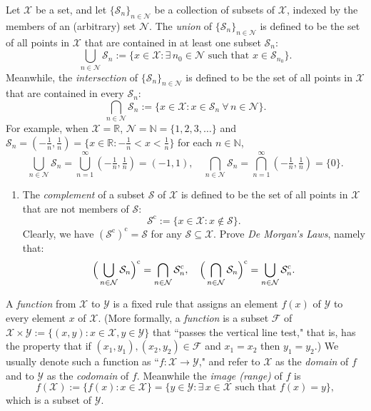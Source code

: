 \documentclass[12 pt,letterpaper]{article}
\newcommand{\bbN}{\mathbb{N}}
\newcommand{\bbR}{\mathbb{R}}
\newcommand{\calF}{\mathcal{F}}
\newcommand{\calN}{\mathcal{N}}
\newcommand{\calS}{\mathcal{S}}
\newcommand{\calX}{\mathcal{X}}
\newcommand{\calY}{\mathcal{Y}}
\newcommand{\rmc}{\mathrm{c}}
\newcommand{\Bigparen}[1]{\Bigl({#1}\Bigr)}
\newcommand{\set}[1]{\{{#1}\}}
\begin{document}
\noindent
Let $\calX$ be a set,
and let $\set{\calS_n}_{n\in\calN}$ be a collection of subsets of $\calX$, indexed by the members of an (arbitrary) set $\calN$.
The \textit{union} of $\set{\calS_n}_{n\in\calN}$ is defined to be the set of all points in $\calX$ that are contained in at least one subset $\calS_n$:
\begin{equation*}
\bigcup_{n\in\calN}\calS_n
:=\set{x\in\calX: \exists\, n_0\in\calN\text{ such that }x\in\calS_{n_0}}.
\end{equation*}
Meanwhile, the \textit{intersection} of $\set{\calS_n}_{n\in\calN}$ is defined to be the set of all points in $\calX$ that are contained in every $\calS_n$:
\begin{equation*}
\bigcap_{n\in\calN}\calS_n
:=\set{x\in\calX: x\in\calS_n\ \forall\,n\in\calN}.
\end{equation*}
For example, when $\calX=\bbR$, $\calN=\bbN=\set{1,2,3,\dotsc}$ and $\calS_n=(-\frac1n,\frac1n)=\set{x\in\bbR: -\frac1n<x<\frac1n}$ for each $n\in\bbN$,
\begin{equation*}
\bigcup_{n\in\calN}\calS_n
=\bigcup_{n=1}^\infty(-\tfrac1n,\tfrac1n)=(-1,1),
\quad
\bigcap_{n\in\calN}\calS_n
=\bigcap_{n=1}^\infty(-\tfrac1n,\tfrac1n)=\set{0}.
\end{equation*}

\begin{enumerate}
\item
The \textit{complement} of a subset $\calS$ of $\calX$ is defined to be the set of all points in $\calX$ that are not members of $\calS$:
\begin{equation*}
\calS^\rmc:=\set{x\in\calX: x\notin\calS}.
\end{equation*}
Clearly, we have $(\calS^\rmc)^\rmc=\calS$ for any $\calS\subseteq\calX$.
Prove \textit{De Morgan's Laws}, namely that:
\begin{equation*}
\Bigparen{\,\bigcup_{n\in\calN}\calS_n}^\rmc
=\bigcap_{n\in\calN}\calS_n^\rmc,
\quad
\Bigparen{\,\bigcap_{n\in\calN}\calS_n}^\rmc
=\bigcup_{n\in\calN}\calS_n^\rmc.
\end{equation*}
\end{enumerate}

\noindent
A \textit{function} from $\calX$ to $\calY$ is a fixed rule that assigns an element $f(x)$ of $\calY$ to every element $x$ of $\calX$.
(More formally, a \textit{function} is a subset $\calF$ of
$\calX\times\calY:=\set{(x,y): x\in\calX, y\in\calY}$
that ``passes the vertical line test," that is,
has the property that if $(x_1,y_1),(x_2,y_2)\in\calF$ and $x_1=x_2$ then $y_1=y_2$.)
We usually denote such a function as ``$f:\calX\rightarrow\calY$,"
and refer to $\calX$ as the \textit{domain} of $f$ and to $\calY$ as the \textit{codomain} of $f$.
Meanwhile the \textit{image (range)} of $f$ is
\begin{equation*}
f(\calX)
:=\set{f(x): x\in\calX}
=\set{y\in\calY: \exists\, x\in\calX\text{ such that }f(x)=y},
\end{equation*}
which is a subset of $\calY$.
\end{document}
